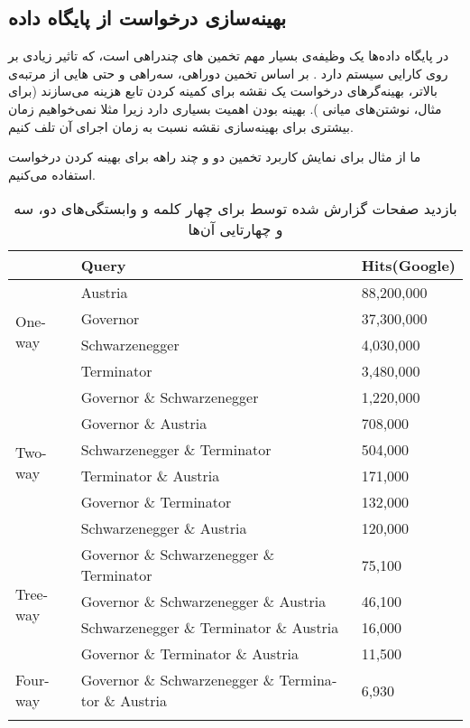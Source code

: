\subsection{
بهینه‌سازی درخواست از پایگاه داده
}

در پایگاه داده‌ها یک وظیفه‌ی بسیار مهم تخمین 
های چندراهی است، که تاثیر زیادی بر روی کارایی سیستم دارد
\cite{litez81}
. بر اساس تخمین دوراهی، سه‌راهی و حتی 
هایی از مرتبه‌ی بالاتر، بهینه‌گرهای درخواست یک نقشه برای کمینه کردن تابع هزینه می‌سازند (برای مثال، نوشتن‌های میانی%
). بهینه بودن اهمیت بسیاری دارد زیرا مثلا نمی‌خواهیم زمان بیشتری برای بهینه‌سازی نقشه نسبت به زمان اجرای آن تلف کنیم.

ما از مثال 
برای نمایش کاربرد تخمین دو و چند راهه برای بهینه کردن درخواست استفاده می‌کنیم.

\begin{table}[h]
\caption{
بازدید صفحات گزارش شده توسط 
برای چهار کلمه و وابستگی‌های دو، سه و چهارتایی آن‌ها
}
\centering
\bigskip
\begin{latin}
\begin{tabular}{lll}
\hhline{===}
        		 & Query		& Hits(Google) 	\\ \hline
\multirow{4}{*}{One-way} & Austria  	& 88,200,000 	\\
			 & Governor  	& 37,300,000 	\\
			 & Schwarzenegger & 4,030,000 	\\
			 & Terminator	 & 3,480,000 	\\ \hline
\multirow{6}{*}{Two-way} & Governor \& Schwarzenegger  	& 1,220,000 	\\ 
			 & Governor \& Austria  	& 708,000 	\\
			 & Schwarzenegger \& Terminator & 504,000 	\\
			 & Terminator \& Austria  	& 171,000 	\\
			 & Governor \& Terminator  	& 132,000 	\\
			 & Schwarzenegger \& Austria  	& 120,000 	\\ \hline
\multirow{4}{*}{Tree-way} & Governor \& Schwarzenegger \& Terminator  	& 75,100 \\
			  & Governor \& Schwarzenegger \& Austria  	& 46,100 \\
			  & Schwarzenegger \& Terminator \& Austria 	& 16,000 \\
			  & Governor \& Terminator \& Austria 		& 11,500 \\ \hline
\multirow{1}{*}{Four-way} & Governor \& Schwarzenegger \& Terminator \& Austria & 6,930	\\
\hhline{===}
\end{tabular}
\end{latin}
\label{tab:governator}
\end{table}


